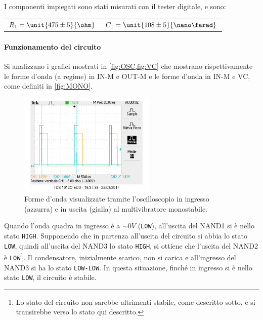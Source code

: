 \documentclass[a4paper,10pt]{article}
\def\code#1{\texttt{#1}}
\begin{document}
I componenti impiegati sono stati misurati con il tester digitale, e sono:

\begin{table}[H]
	\centering
	\begin{tabular}{cc}
		$R_1 = \unit{475 \pm5}{\ohm}$ & $C_1 = \unit{108 \pm 5}{\nano\farad}$\\
	\end{tabular}
\end{table}




\paragraph{Funzionamento del circuito}
Si analizzano i grafici mostrati in \cref{fig:OSC,fig:VC} che mostrano rispettivamente le forme d'onda (a regime) in IN-M e OUT-M e le forme d'onda in IN-M e VC, come definiti in \cref{fig:MONO}.

\begin{figure}[H]
	\centering
	\includegraphics[width=0.58\textwidth]{../grafici/monostabileOSC.png}
	\caption{Forme d'onda visualizzate tramite l'oscilloscopio in ingresso (azzurra) e in uscita (gialla) al multivibratore monostabile.}
	\label{fig:OSC}
\end{figure}

Quando l'onda quadra in ingresso è a $\sim 0V$ (\code{LOW}), all'uscita del NAND1 si è nello stato \code{HIGH}. Supponendo che in partenza  all'uscita del circuito si abbia lo stato \code{LOW}, quindi all'uscita del NAND3 lo stato \code{HIGH}, si ottiene che l'uscita del NAND2 è \code{LOW}\footnote{Lo stato del circuito non sarebbe altrimenti stabile, come descritto sotto, e si transirebbe verso lo stato qui descritto.}. Il condensatore, inizialmente scarico, non si carica e all'ingresso del NAND3 si ha lo stato \code{LOW-LOW}. In questa situazione, finché in ingresso si è nello stato \code{LOW}, il circuito è stabile.
\end{document}
